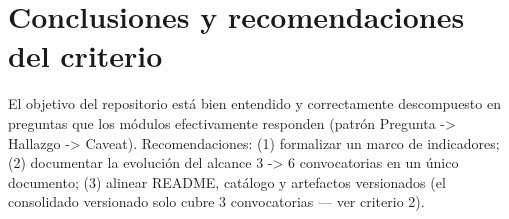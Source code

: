 \section{Conclusiones y recomendaciones del criterio}

El objetivo del repositorio está bien entendido y correctamente descompuesto en preguntas que los módulos efectivamente responden (patrón Pregunta -> Hallazgo -> Caveat). Recomendaciones: (1) formalizar un marco de indicadores; (2) documentar la evolución del alcance 3 -> 6 convocatorias en un único documento; (3) alinear README, catálogo y artefactos versionados (el consolidado versionado solo cubre 3 convocatorias --- ver criterio 2).

